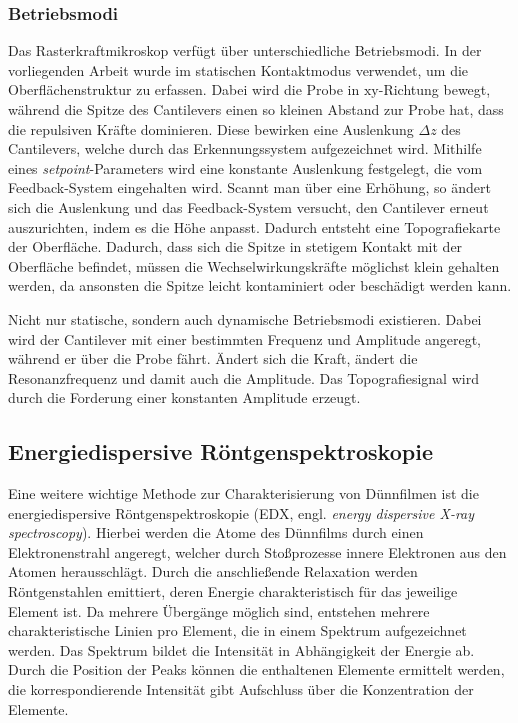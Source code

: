 \subsubsection{Betriebsmodi}
Das Rasterkraftmikroskop verfügt über unterschiedliche Betriebsmodi.
In der vorliegenden Arbeit wurde im statischen Kontaktmodus verwendet, um die Oberflächenstruktur zu erfassen.
Dabei wird die Probe in $\mathrm{xy}$-Richtung bewegt, während die Spitze des Cantilevers einen so kleinen Abstand zur
Probe hat, dass die repulsiven Kräfte dominieren.
Diese bewirken eine Auslenkung $\Delta z$ des Cantilevers, welche durch das Erkennungssystem aufgezeichnet wird.
Mithilfe eines \textit{setpoint}-Parameters wird eine konstante Auslenkung festgelegt, die vom Feedback-System
eingehalten wird.
Scannt man über eine Erhöhung, so ändert sich die Auslenkung und das Feedback-System versucht, den Cantilever erneut
auszurichten, indem es die Höhe anpasst.
Dadurch entsteht eine Topografiekarte der Oberfläche.
Dadurch, dass sich die Spitze in stetigem Kontakt mit der Oberfläche befindet, müssen die Wechselwirkungskräfte
möglichst klein gehalten werden,
da ansonsten die Spitze leicht kontaminiert oder beschädigt werden kann.\autocite[199-201]{afm-buch}

Nicht nur statische, sondern auch dynamische Betriebsmodi existieren.
Dabei wird der Cantilever mit einer bestimmten Frequenz und Amplitude angeregt, während er über die Probe fährt.
Ändert sich die Kraft, ändert die Resonanzfrequenz und damit auch die Amplitude.
Das Topografiesignal wird durch die Forderung einer konstanten Amplitude erzeugt.\autocite[209]{afm-buch}

\subsection{Energiedispersive Röntgenspektroskopie}\label{sec:energiedispersive-rontgenspektroskopie}
Eine weitere wichtige Methode zur Charakterisierung von Dünnfilmen ist die energiedispersive Röntgenspektroskopie
(EDX, engl. \textit{energy dispersive X-ray spectroscopy}).
Hierbei werden die Atome des Dünnfilms durch einen Elektronenstrahl angeregt, welcher durch Stoßprozesse innere
Elektronen aus den Atomen herausschlägt.
Durch die anschließende Relaxation werden Röntgenstahlen emittiert, deren Energie charakteristisch für das jeweilige
Element ist.
Da mehrere Übergänge möglich sind, entstehen mehrere charakteristische Linien pro Element, die in einem Spektrum
aufgezeichnet werden.
Das Spektrum bildet die Intensität in Abhängigkeit der Energie ab.
Durch die Position der Peaks können die enthaltenen Elemente ermittelt werden,
die korrespondierende Intensität gibt Aufschluss über die Konzentration der Elemente.
\autocite[7-11]{edx}


